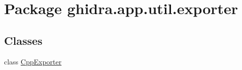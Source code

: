 \hypertarget{namespaceghidra_1_1app_1_1util_1_1exporter}{}\section{Package ghidra.\+app.\+util.\+exporter}
\label{namespaceghidra_1_1app_1_1util_1_1exporter}
\subsection*{Classes}
\begin{DoxyCompactItemize}
\item 
class \mbox{\hyperlink{classghidra_1_1app_1_1util_1_1exporter_1_1_cpp_exporter}{Cpp\+Exporter}}
\end{DoxyCompactItemize}

